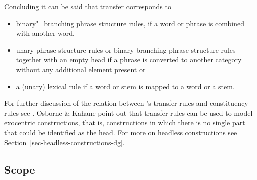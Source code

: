 Concluding it can be said that transfer corresponds to 
\begin{itemize}
\item binary"=branching phrase structure rules,
if a word or phrase is combined with another word, 
\item unary phrase structure rules or binary branching phrase structure rules together with an empty head if
  a phrase is converted to another category without any additional element present or
\item a (unary) lexical rule if a word or stem is mapped to a word or a stem.
\end{itemize}
For further discussion of the relation between \tes's transfer rules and constituency rules see
. Osborne \& Kahane point out that transfer rules can be used
to model exocentric constructions, that is, constructions in which there is no single part that
could be identified as the head. For more on headless constructions see Section~\ref{sec-headless-constructions-dg}.

\subsection{Scope}

